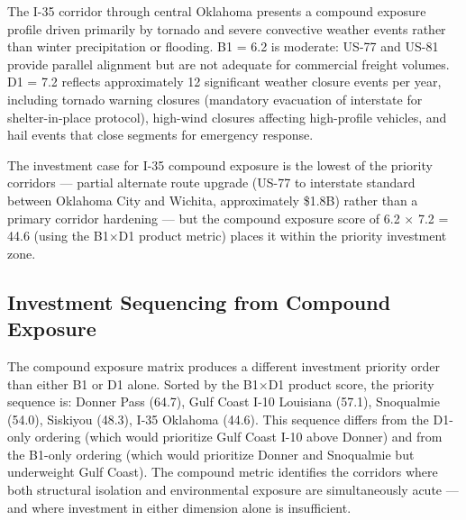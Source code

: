 The I-35 corridor through central Oklahoma presents a compound exposure profile driven primarily by tornado and severe convective weather events rather than winter precipitation or flooding. B1 = 6.2 is moderate: US-77 and US-81 provide parallel alignment but are not adequate for commercial freight volumes. D1 = 7.2 reflects approximately 12 significant weather closure events per year, including tornado warning closures (mandatory evacuation of interstate for shelter-in-place protocol), high-wind closures affecting high-profile vehicles, and hail events that close segments for emergency response.

The investment case for I-35 compound exposure is the lowest of the priority corridors --- partial alternate route upgrade (US-77 to interstate standard between Oklahoma City and Wichita, approximately \$1.8B) rather than a primary corridor hardening --- but the compound exposure score of 6.2 $\times$ 7.2 = 44.6 (using the B1$\times$D1 product metric) places it within the priority investment zone.

\subsection{Investment Sequencing from Compound Exposure}

The compound exposure matrix produces a different investment priority order than either B1 or D1 alone. Sorted by the B1$\times$D1 product score, the priority sequence is: Donner Pass (64.7), Gulf Coast I-10 Louisiana (57.1), Snoqualmie (54.0), Siskiyou (48.3), I-35 Oklahoma (44.6). This sequence differs from the D1-only ordering (which would prioritize Gulf Coast I-10 above Donner) and from the B1-only ordering (which would prioritize Donner and Snoqualmie but underweight Gulf Coast). The compound metric identifies the corridors where both structural isolation and environmental exposure are simultaneously acute --- and where investment in either dimension alone is insufficient.
